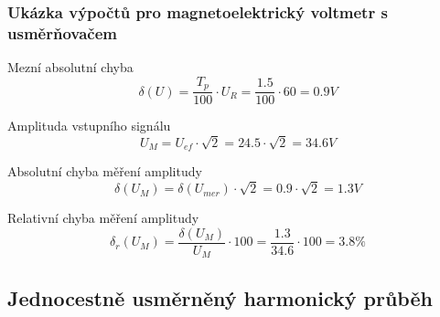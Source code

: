 \documentclass{praktikum}
\begin{document}
\subsubsection{Ukázka výpočtů pro magnetoelektrický voltmetr s usměrňovačem}
Mezní absolutní chyba
\begin{equation}
\label{eqn:vypocet_harm_meznichyba}
\delta (U) = \frac{T_p}{100}\cdot U_R = \frac{1.5}{100}\cdot 60=0.9V
\end{equation}

Amplituda vstupního signálu
\begin{equation}
\label{eqn:vypocet_harm_amplituda}
U_M = U_{ef} \cdot \sqrt{2} = 24.5 \cdot \sqrt{2} = 34.6V
\end{equation}

Absolutní chyba měření amplitudy
\begin{equation}
\label{eqn:vypocet_harm_abschyba_amp}
\delta (U_M) = \delta (U_{mer}) \cdot \sqrt{2} = 0.9 \cdot \sqrt{2} = 1.3V
\end{equation}

Relativní chyba měření amplitudy
\begin{equation}
\label{eqn:vypocet_harm_relchyba_amp}
\delta _r (U_M) = \frac{\delta (U_M)}{U_M}\cdot 100 = \frac{1.3}{34.6}\cdot 100 = 3.8 \%
\end{equation}

\subsection{Jednocestně usměrněný harmonický průběh}
\end{document}
